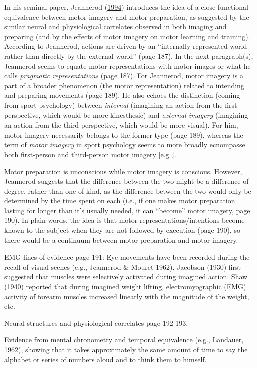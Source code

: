 \documentclass[a4paper,12pt,twoside,openright,oldfontcommands]{memoir}
\begin{document}
In his seminal paper, Jeannerod (\protect\hyperlink{ref-jeannerod_representing_1994}{1994}) introduces the idea of a close functional equivalence between motor imagery and motor preparation, as suggested by the similar neural and physiological correlates observed in both imaging and preparing (and by the effects of motor imagery on motor learning and training). According to Jeannerod, actions are driven by an \enquote{internally represented world rather than directly by the external world} (page 187). In the next paragraph(s), Jeannerod seems to equate motor representations with motor images or what he calls \emph{pragmatic representations} (page 187). For Jeannerod, motor imagery is a part of a broader phenomenon (the motor representation) related to intending and preparing movements (page 189). He also echoes the distinction (coming from sport psychology) between \emph{internal} (imagining an action from the first perspective, which would be more kinesthesic) and \emph{external imagery} (imagining an action from the third perspective, which would be more visual). For him, motor imagery necessarily belongs to the former type (page 189), whereas the term of \emph{motor imagery} in sport psychology seems to more broadly ecnompasse both first-person and third-person motor imagery {[}e.g.,{]}.

Motor preparation is unconscious while motor imagery is conscious. However, Jeannerod suggests that the difference between the two might be a difference of degree, rather than one of kind, as the difference between the two would only be determined by the time spent on each (i.e., if one makes motor preparation lasting for longer than it's usually needed, it can \enquote{become} motor imagery, page 190). In plain words, the idea is that motor representations/intentions become known to the subject when they are not followed by execution (page 190), so there would be a continuum between motor preparation and motor imagery.

EMG lines of evidence page 191: Eye movements have been recorded during the recall of visual scenes (e.g., Jeannerod \& Mouret 1962). Jacobson (1930) first suggested that muscles were selectively activated during imagined action. Shaw (1940) reported that during imagined weight lifting, electromyographic (EMG) activity of forearm muscles increased linearly with the magnitude of the weight, etc.

Neural structures and physiological correlates page 192-193.

Evidence from mental chronometry and temporal equivalence (e.g., Landauer, 1962), showing that it takes approximately the same amount of time to say the alphabet or series of numbers aloud and to think them to himself.
\end{document}
